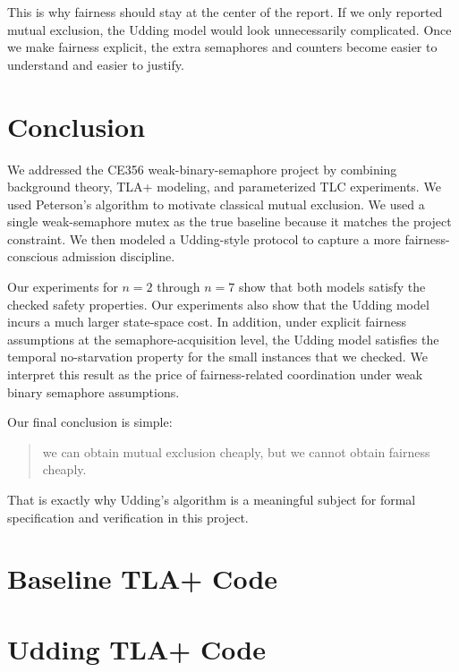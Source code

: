 \documentclass[11pt]{article}
\begin{document}
This is why fairness should stay at the center of the report. If we only reported mutual exclusion, the Udding model would look unnecessarily complicated. Once we make fairness explicit, the extra semaphores and counters become easier to understand and easier to justify.

\section{Conclusion}

We addressed the CE356 weak-binary-semaphore project by combining background theory, TLA+ modeling, and parameterized TLC experiments. We used Peterson's algorithm to motivate classical mutual exclusion. We used a single weak-semaphore mutex as the true baseline because it matches the project constraint. We then modeled a Udding-style protocol to capture a more fairness-conscious admission discipline.

Our experiments for $n=2$ through $n=7$ show that both models satisfy the checked safety properties. Our experiments also show that the Udding model incurs a much larger state-space cost. In addition, under explicit fairness assumptions at the semaphore-acquisition level, the Udding model satisfies the temporal no-starvation property for the small instances that we checked. We interpret this result as the price of fairness-related coordination under weak binary semaphore assumptions.

Our final conclusion is simple:

\begin{quote}
we can obtain mutual exclusion cheaply, but we cannot obtain fairness cheaply.
\end{quote}

That is exactly why Udding's algorithm is a meaningful subject for formal specification and verification in this project.

\appendix

\section{Baseline TLA+ Code}


\section{Udding TLA+ Code}

\end{document}
